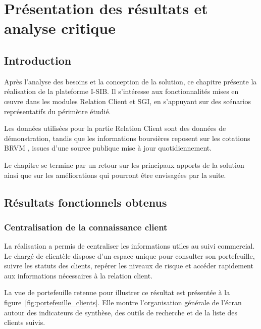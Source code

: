 \chapter{Présentation des résultats et analyse critique}

\section*{Introduction}
{}


Après l'analyse des besoins et la conception de la solution, ce chapitre présente la réalisation de la plateforme I-SIB. Il s'intéresse aux fonctionnalités mises en œuvre dans les modules Relation Client et SGI, en s'appuyant sur des scénarios représentatifs du périmètre étudié.

 Les données utilisées pour la partie Relation Client sont des données de démonstration, tandis que les informations boursières reposent sur les cotations BRVM \cite{brvm_data_public}, issues d'une source publique mise à jour quotidiennement.

Le chapitre se termine par un retour sur les principaux apports de la solution ainsi que sur les améliorations qui pourront être envisagées par la suite.


\section{Résultats fonctionnels obtenus}

\subsection{Centralisation de la connaissance client}

La réalisation a permis de centraliser les informations utiles au suivi
commercial. Le chargé de clientèle dispose d'un espace unique pour consulter son
portefeuille, suivre les statuts des clients, repérer les niveaux de risque et
accéder rapidement aux informations nécessaires à la relation client.

La vue de portefeuille retenue pour illustrer ce résultat est présentée à la
figure~\ref{fig:portefeuille_clients}. Elle montre l'organisation générale de
l'écran autour des indicateurs de synthèse, des outils de recherche et de la
liste des clients suivis.

